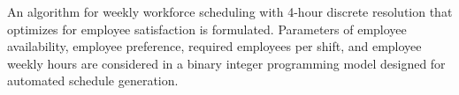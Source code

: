 An algorithm for weekly workforce scheduling with 4-hour discrete resolution that optimizes for employee satisfaction is formulated. Parameters of employee availability, employee preference, required employees per shift, and employee weekly hours are considered in a binary integer programming model designed for automated schedule generation. 
